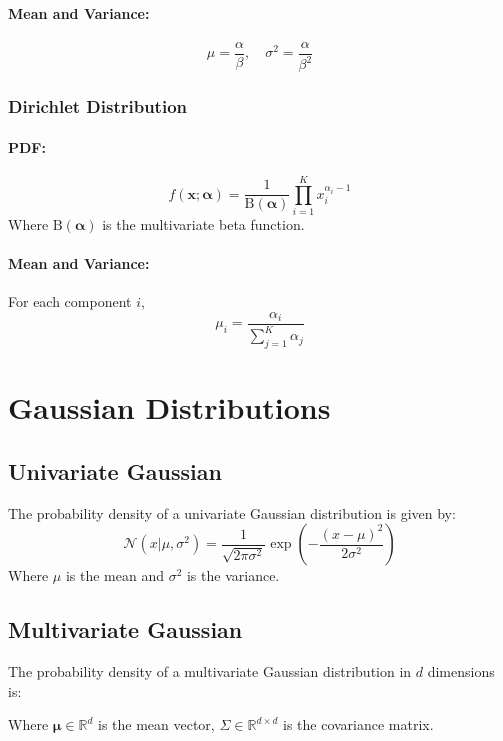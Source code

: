 \documentclass[8pt, a4paper, landscape, includeheadfoot]{extarticle}
\begin{document}
\begin{multicols*}{4}
	\paragraph{Mean and Variance:}
	$$
		\mu = \frac{\alpha}{\beta}, \quad \sigma^2 = \frac{\alpha}{\beta^2}
	$$

	\subsubsection{Dirichlet Distribution}{}
	\paragraph{PDF:}
	$$
		f(\mathbf{x}; \boldsymbol{\alpha}) = \frac{1}{\mathrm{B}(\boldsymbol{\alpha})} \prod_{i=1}^{K} x_i^{\alpha_i - 1}
	$$
	Where $\mathrm{B}(\boldsymbol{\alpha})$ is the multivariate beta function.
	\paragraph{Mean and Variance:}
	For each component $i$,
	$$
		\mu_i = \frac{\alpha_i}{\sum_{j=1}^K \alpha_j}
	$$


	\section{Gaussian Distributions}
	\subsection{Univariate Gaussian}
	The probability density of a univariate Gaussian distribution is given by:
	$$
		\mathcal{N}(x | \mu, \sigma^2) = \frac{1}{\sqrt{2\pi \sigma^2}} \exp\left( -\frac{(x-\mu)^2}{2\sigma^2} \right)
	$$
	Where $\mu$ is the mean and $\sigma^2$ is the variance.

	\subsection{Multivariate Gaussian}
	The probability density of a multivariate Gaussian distribution in $d$ dimensions is:

	\vskip5pt

	\vskip5pt

	Where $\boldsymbol{\mu}\in\mathbb{R}^d$ is the mean vector, $\Sigma\in\mathbb{R}^{d\times d}$ is the covariance matrix.


\end{multicols*}
\end{document}
